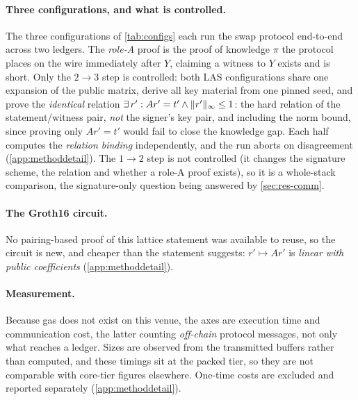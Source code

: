 \paragraph{Three configurations, and what is controlled.}
The three configurations of \cref{tab:configs} each run the swap protocol end-to-end
across two ledgers. The \emph{role-A} proof is the proof of knowledge $\pi$ the protocol
places on the wire immediately after $Y$, claiming a witness to $Y$ exists and is short.
Only the $2\to3$ step is controlled: both LAS configurations share one expansion of the
public matrix, derive all key material from one pinned seed, and prove the
\emph{identical} relation
$\exists\, r' : A r' = t' \wedge \lVert r' \rVert_\infty \le 1$: the hard relation of the
statement/witness pair, \emph{not} the signer's key pair, and including the norm bound,
since proving only $A r' = t'$ would fail to close the knowledge gap. Each half computes
the \emph{relation binding} independently, and the run aborts on disagreement
(\cref{app:methoddetail}).
The $1\to2$ step is not controlled (it changes the signature scheme, the relation and
whether a role-A proof exists), so it is a whole-stack comparison, the signature-only
question being answered by \cref{sec:res-comm}.

\paragraph{The Groth16 circuit.}
No pairing-based proof of this lattice statement was available to reuse, so the circuit is
new, and cheaper than the statement suggests: $r' \mapsto A r'$ is \emph{linear with public
coefficients} (\cref{app:methoddetail}).

\paragraph{Measurement.}
Because gas does not exist on this venue, the axes are execution time and communication
cost, the latter counting \emph{off-chain} protocol messages, not only what reaches a
ledger. Sizes are observed from the transmitted buffers rather than computed, and these
timings sit at the packed tier, so they are not comparable with core-tier figures
elsewhere. One-time costs are excluded and reported separately (\cref{app:methoddetail}).
